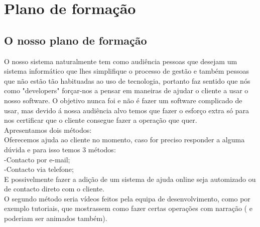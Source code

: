 \chapter{Plano de formação}
\label{plano_de_formaçao}
\section{O nosso plano de formação}
O nosso sistema naturalmente tem como audiência pessoas que desejam um sistema informático que lhes simplifique o processo de gestão e também pessoas que não estão tão habituadas ao uso de tecnologia, portanto faz sentido que nós como "developers" forçar-nos a pensar em maneiras de ajudar o cliente a usar o nosso software. O objetivo nunca foi e não é fazer um software complicado de usar, mas devido á nossa audiência alvo temos que fazer o esforço extra só para nos certificar que o cliente consegue fazer a operação que quer.\\
Apresentamos dois métodos:\\
Oferecemos ajuda ao cliente no momento, caso for preciso responder a alguma dúvida e para isso temos 3 métodos:\\
 -Contacto por e-mail;\\
 -Contacto via telefone;\\
	E possivelmente fazer a adição de um sistema de ajuda online seja automizado ou de contacto direto com o cliente.\\
O segundo método seria vídeos feitos pela equipa de desenvolvimento, como por exemplo tutoriais, que mostrassem como fazer certas operações com narração ( e poderiam ser animados também).\\
 
